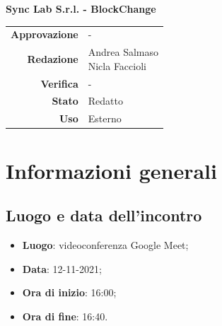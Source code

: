 \documentclass[11pt]{article}
\begin{document}
\begin{titlepage}
\begin{center}
			\large
			\textbf{Sync Lab S.r.l. - BlockChange}\\
			
			\vfill
			
			\begin{tabular}{r|l}
				\textbf{Approvazione} &  -\\
				\textbf{Redazione} &  \parbox[t]{3.5cm}{Andrea Salmaso \\Nicla Faccioli}\\
				\textbf{Verifica} &  -\\
				\textbf{Stato} & Redatto \\
				\textbf{Uso} & Esterno
			\end{tabular}
			\vfill
			
		\end{center}
	\end{titlepage}

	\newpage
	
	\section{Informazioni generali}
		\subsection{Luogo e data dell'incontro}
			\begin{itemize}
				\item \textbf{Luogo}: videoconferenza Google Meet;
				\item \textbf{Data}: 12-11-2021;
				\item \textbf{Ora di inizio}: 16:00;
				\item \textbf{Ora di fine}: 16:40.
			\end{itemize}
		
\end{document}
